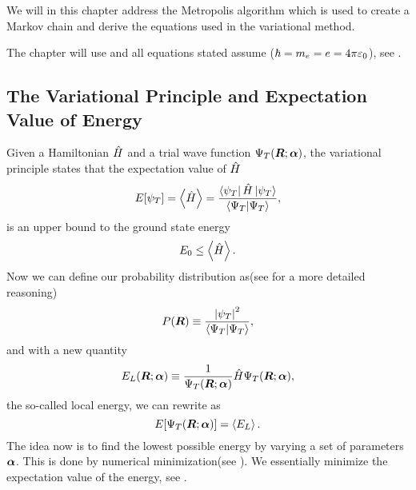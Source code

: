     We will in this chapter address the Metropolis algorithm which is used to
    create a Markov chain and derive the equations used in the variational
    method.

    The chapter will use  \cite{GriffQuan} and all
    equations stated assume  \cite{atomicunits}
    ($\hbar=m_e=e=4\pi\varepsilon_0$), see .

    \subsection{The Variational Principle and Expectation Value of Energy}
        Given a Hamiltonian $\hat{H}$ and a trial wave function ${\Psi}_T(\boldsymbol{{R}};\boldsymbol{{\alpha}})$, the
        variational principle \cite{GriffQuan, NeOr} states that the
        expectation value of $\hat{H}$
            \begin{equation}
                E[\psi_T] = \left< {\hat{H}} \right> =
                \frac{\bra{\psi_T}\hat{H}\ket{\psi_T}}{\bra{\Psi_T}\ket{\Psi_T}},
                \label{eq:ecpE}
            \end{equation}
        is an upper bound to the ground state energy
            \begin{equation}
                E_0 \leq \left< {\hat{H}} \right>.
                \label{eq:ecpEBound}
            \end{equation}
        Now we can define our probability distribution as(see
         for a more detailed reasoning)
            \begin{equation}
                P(\boldsymbol{{R}}) \equiv \frac{\abs{\psi_T}^2}{\bra{\Psi_T}\ket{\Psi_T}},
                \label{eq:PDFdef}
            \end{equation}
        and with a new quantity
            \begin{equation}
                E_L(\boldsymbol{{R}};\boldsymbol{{\alpha}}) \equiv \frac{1}{{\Psi}_T(\boldsymbol{{R}};\boldsymbol{{\alpha}})}\hat{H}{\Psi}_T(\boldsymbol{{R}};\boldsymbol{{\alpha}}),
                \label{eq:ELdef}
            \end{equation}
        the so-called local energy, we can rewrite  as
            \begin{equation}
                E[{\Psi}_T(\boldsymbol{{R}};\boldsymbol{{\alpha}})] = \left< {E_L} \right>.
            \end{equation}
        The idea now is to find the lowest possible energy by varying a set of
        parameters $\boldsymbol{{\alpha}}$. This is done by numerical minimization(see
        ). We essentially minimize the expectation value of the
        energy, see .

